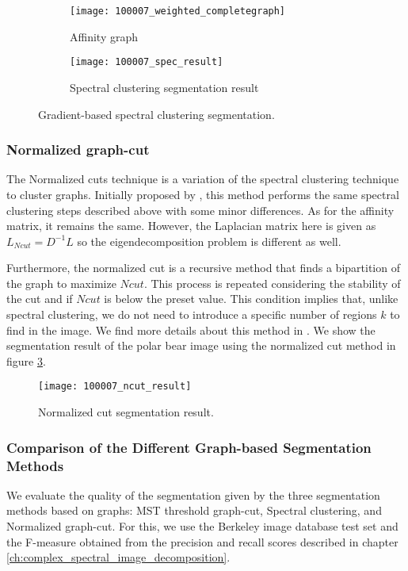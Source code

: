 \begin{figure}[!ht]
    \centering
    \begin{subfigure}[b]{0.49\textwidth}
    	\texttt{[image: 100007\_weighted\_completegraph]} 
    	\caption{Affinity graph}
    \end{subfigure}      
    \begin{subfigure}[b]{0.49\textwidth}
        \texttt{[image: 100007\_spec\_result]}
        \caption{Spectral clustering segmentation result}
        \label{fig:spectral_clustering_segm_result} 
    \end{subfigure}    
	\caption{Gradient-based spectral clustering segmentation.}\label{fig:spectral_clustering_process}    
\end{figure}


\subsubsection{Normalized graph-cut}
The Normalized cuts technique is a variation of the spectral clustering technique to cluster graphs. Initially proposed by \cite{JianboShi.Malik:PAMI:2000}, this method performs the same spectral clustering steps described above with some minor differences. As for the affinity matrix, it remains the same. However, the Laplacian matrix here is given as
$L_{Ncut} = D^{-1}L$
so the eigendecomposition problem is different as well.

Furthermore, the normalized cut is a recursive method that finds a bipartition of the graph to maximize $Ncut$. This process is repeated considering the stability of the cut and if $Ncut$ is below the preset value. This condition implies that, unlike spectral clustering, we do not need to introduce a specific number of regions $k$ to find in the image. We find more details about this method in \cite{JianboShi.Malik:PAMI:2000}. We show the segmentation result of the polar bear image using the normalized cut method in figure \ref{fig:norm_cut_segm_result}. 

\begin{figure}[!ht]
    \centering
  	\texttt{[image: 100007\_ncut\_result]}
    \caption{Normalized cut segmentation result.}
    \label{fig:norm_cut_segm_result}    
\end{figure}


\subsubsection{Comparison of the Different Graph-based Segmentation Methods}
We evaluate the quality of the segmentation given by the three segmentation methods based on graphs: MST threshold graph-cut, Spectral clustering, and Normalized graph-cut.  For this, we use the Berkeley image database test set and the F-measure obtained from the precision and recall scores described in chapter \ref{ch:complex_spectral_image_decomposition}. 

